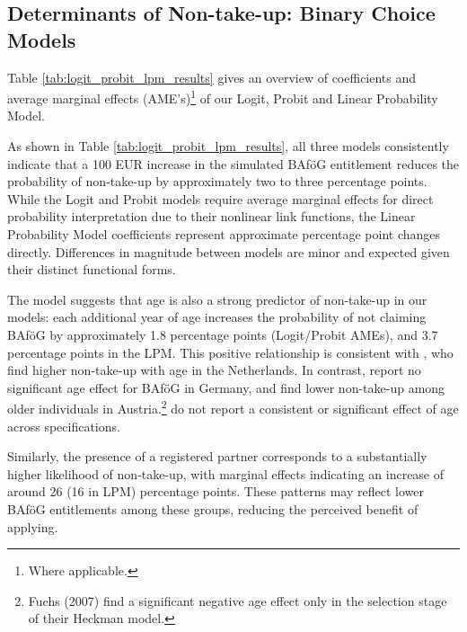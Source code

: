 \subsection{Determinants of Non-take-up: Binary Choice Models}
Table \ref{tab:logit_probit_lpm_results} gives an overview of coefficients and average marginal effects (AME's)\footnote{Where applicable.} of our Logit, Probit and Linear Probability Model.


As shown in Table \ref{tab:logit_probit_lpm_results}, all three models consistently indicate that a 100 EUR increase in the simulated BAföG entitlement reduces the probability of non-take-up by approximately two to three percentage points. 
While the Logit and Probit models require average marginal effects for direct probability interpretation due to their nonlinear link functions, the Linear Probability Model coefficients represent approximate percentage point changes directly. 
Differences in magnitude between models are minor and expected given their distinct functional forms.




The model suggests that age is also a strong predictor of non-take-up in our models: each additional year of age increases the probability of not claiming BAföG by approximately 1.8 percentage points (Logit/Probit AMEs), and 3.7 percentage points in the LPM. 
This positive relationship is consistent with \cite{konijn_quantifying_2023}, who find higher non-take-up with age in the Netherlands. 
In contrast, \cite{herber_non-take-up_2019} report no significant age effect for BAföG in Germany, and \cite{fuchs_austria_2007} find lower non-take-up among older individuals in Austria.\footnote{Fuchs (2007) find a significant negative age effect only in the selection stage of their Heckman model.}
\cite{frick_claim_2007} do not report a consistent or significant effect of age across specifications.

Similarly, the presence of a registered partner corresponds to a substantially higher likelihood of non-take-up, with marginal effects indicating an increase of around 26 (16 in LPM) percentage points. 
These patterns may reflect lower BAföG entitlements among these groups, reducing the perceived benefit of applying. 


